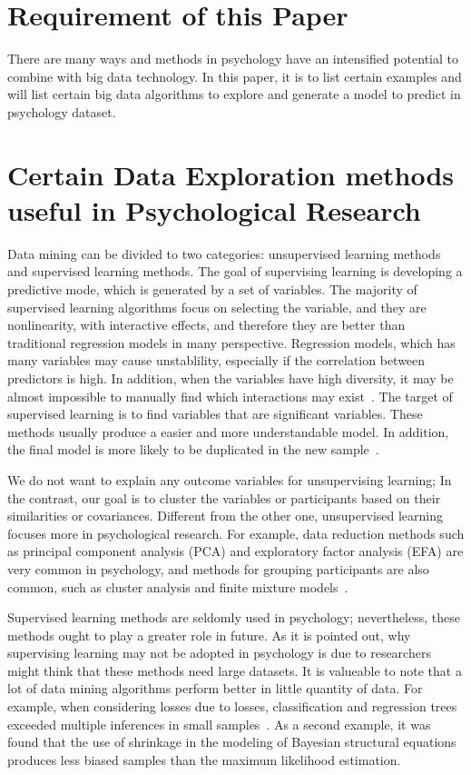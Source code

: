 \section{Requirement of this Paper}
There are many ways and methods in psychology have an intensified 
potential to combine with big data technology. In this paper, it is to
 list certain examples and will list certain big data algorithms to 
explore and generate a model to predict in psychology dataset. 

\section{Certain Data Exploration methods 
useful in Psychological Research}

Data mining can be divided to two categories: 
unsupervised learning methods and supervised learning methods. The
 goal of supervising learning is developing a predictive mode, 
which is generated by a set of variables. The majority of 
supervised learning algorithms focus on selecting the variable, 
and they are nonlinearity, with interactive effects, 
and therefore they are better than traditional regression models in
many perspective. Regression models, which has many variables may 
cause unstablility, especially if the correlation between predictors 
is high. In addition, 
when the variables have high diversity, it may be almost impossible
 to manually find which interactions may exist~\cite{hid515-11}. 
The target of 
supervised learning is to find variables that are 
significant variables. 
These methods usually produce a easier and more 
understandable model. 
In addition, the final model is more likely to be duplicated in the
 new sample~\cite{hid515-11}.

We do not want to explain any outcome variables for unsupervising 
learning; In the contrast, 
our goal is to cluster the variables or participants
 based on their similarities or covariances. 
Different from the 
other one, unsupervised learning focuses more in 
psychological research. For example, data reduction methods such as
 principal component analysis (PCA) and exploratory factor analysis
 (EFA) are very common in psychology, 
and methods for grouping 
participants are also common, such as cluster analysis and finite 
mixture models~\cite{hid515-11}.

Supervised learning methods are seldomly used in psychology; 
nevertheless,
 these methods ought to play a greater role in future. As it is  
pointed out, why supervising learning may not be adopted in 
psychology is due to researchers might
 think that these methods need large datasets. It is valueable to
 note that a lot of data mining algorithms perform better in little 
quantity of data. For example, when considering losses due to losses, 
classification and regression trees exceeded multiple inferences in
 small samples~\cite{hid515-11}. 
As a second example, it was found that the use of 
shrinkage in the modeling of Bayesian 
structural equations produces less biased samples than the maximum
 likelihood estimation.

